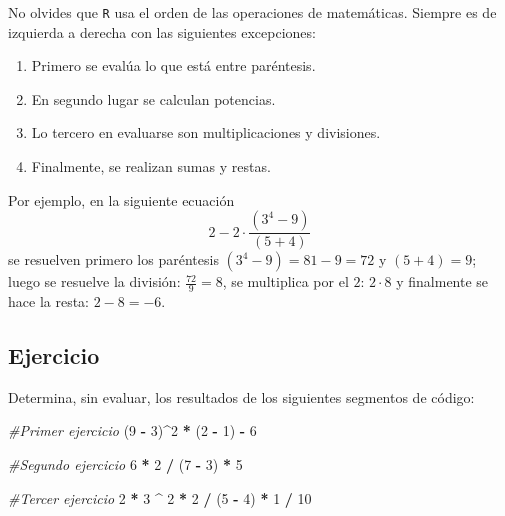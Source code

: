 \documentclass[
]{book}
\newenvironment{Shaded}{\begin{snugshade}}{\end{snugshade}}
\newcommand{\CommentTok}[1]{\textcolor[rgb]{0.56,0.35,0.01}{\textit{#1}}}
\newcommand{\DecValTok}[1]{\textcolor[rgb]{0.00,0.00,0.81}{#1}}
\newcommand{\NormalTok}[1]{#1}
\newcommand{\OperatorTok}[1]{\textcolor[rgb]{0.81,0.36,0.00}{\textbf{#1}}}
\newcommand{\StringTok}[1]{\textcolor[rgb]{0.31,0.60,0.02}{#1}}
\begin{document}
No olvides que \texttt{R} usa el orden de las operaciones de matemáticas. Siempre es de izquierda a derecha con las siguientes excepciones:

\begin{enumerate}
\def\labelenumi{\arabic{enumi}.}
\item
  Primero se evalúa lo que está entre paréntesis.
\item
  En segundo lugar se calculan potencias.
\item
  Lo tercero en evaluarse son multiplicaciones y divisiones.
\item
  Finalmente, se realizan sumas y restas.
\end{enumerate}

Por ejemplo, en la siguiente ecuación
\[
2 - 2 \cdot \frac{(3^4 - 9)}{(5 + 4)}
\]
se resuelven primero los paréntesis \((3^4 - 9) = 81 - 9 = 72\) y \((5 + 4) = 9\); luego se resuelve la división: \(\frac{72}{9}=8\), se multiplica por el \(2\): \(2 \cdot 8\) y finalmente se hace la resta: \(2-8 = -6\).

\hypertarget{ejercicio}{%
\subsection{Ejercicio}\label{ejercicio}}

Determina, sin evaluar, los resultados de los siguientes segmentos de código:

\begin{Shaded}
\begin{Highlighting}[]
\CommentTok{#Primer ejercicio }
\NormalTok{(}\DecValTok{9} \OperatorTok{-}\StringTok{ }\DecValTok{3}\NormalTok{)}\OperatorTok{^}\DecValTok{2} \OperatorTok{*}\StringTok{ }\NormalTok{(}\DecValTok{2} \OperatorTok{-}\StringTok{ }\DecValTok{1}\NormalTok{) }\OperatorTok{-}\StringTok{ }\DecValTok{6}
\end{Highlighting}
\end{Shaded}

\begin{Shaded}
\begin{Highlighting}[]
\CommentTok{#Segundo ejercicio }
\DecValTok{6} \OperatorTok{*}\StringTok{ }\DecValTok{2} \OperatorTok{/}\StringTok{ }\NormalTok{(}\DecValTok{7} \OperatorTok{-}\StringTok{ }\DecValTok{3}\NormalTok{) }\OperatorTok{*}\StringTok{ }\DecValTok{5}
\end{Highlighting}
\end{Shaded}

\begin{Shaded}
\begin{Highlighting}[]
\CommentTok{#Tercer ejercicio }
\DecValTok{2} \OperatorTok{*}\StringTok{ }\DecValTok{3} \OperatorTok{^}\StringTok{ }\DecValTok{2} \OperatorTok{*}\StringTok{ }\DecValTok{2} \OperatorTok{/}\StringTok{ }\NormalTok{(}\DecValTok{5} \OperatorTok{-}\StringTok{ }\DecValTok{4}\NormalTok{) }\OperatorTok{*}\StringTok{ }\DecValTok{1} \OperatorTok{/}\StringTok{ }\DecValTok{10} 
\end{Highlighting}
\end{Shaded}
\end{document}
